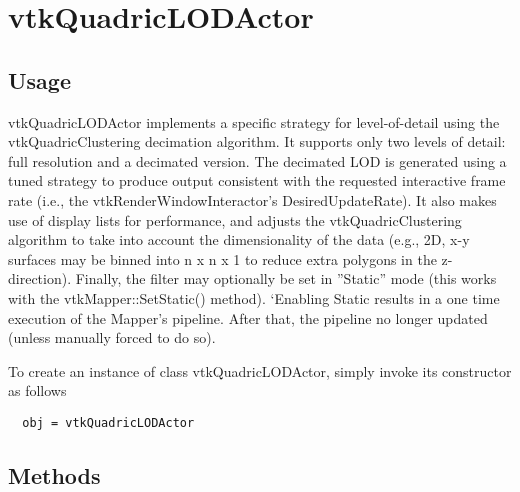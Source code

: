 \section{vtkQuadricLODActor}

\subsection{Usage}

 vtkQuadricLODActor implements a specific strategy for level-of-detail
 using the vtkQuadricClustering decimation algorithm. It supports only two
 levels of detail: full resolution and a decimated version. The decimated
 LOD is generated using a tuned strategy to produce output consistent with
 the requested interactive frame rate (i.e., the
 vtkRenderWindowInteractor's DesiredUpdateRate). It also makes use of
 display lists for performance, and adjusts the vtkQuadricClustering
 algorithm to take into account the dimensionality of the data (e.g., 2D,
 x-y surfaces may be binned into n x n x 1 to reduce extra polygons in the
 z-direction). Finally, the filter may optionally be set in ''Static'' mode
 (this works with the vtkMapper::SetStatic() method). `Enabling Static results
 in a one time execution of the Mapper's pipeline. After that, the pipeline
 no longer updated (unless manually forced to do so). 


To create an instance of class vtkQuadricLODActor, simply
invoke its constructor as follows
\begin{verbatim}
  obj = vtkQuadricLODActor
\end{verbatim}
\subsection{Methods}

